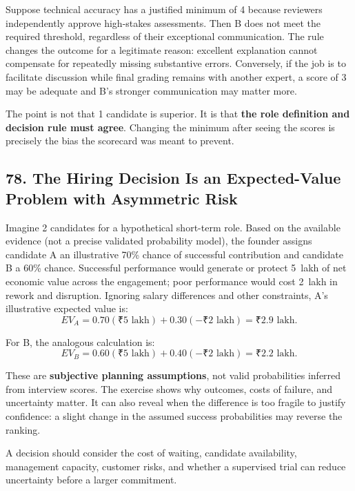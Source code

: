 Suppose technical accuracy has a justified minimum of 4 because reviewers independently approve high-stakes assessments. Then B does not meet the required threshold, regardless of their exceptional communication. The rule changes the outcome for a legitimate reason: excellent explanation cannot compensate for repeatedly missing substantive errors. Conversely, if the job is to facilitate discussion while final grading remains with another expert, a score of 3 may be adequate and B's stronger communication may matter more.

The point is not that 1 candidate is superior. It is that \textbf{the role definition and decision rule must agree}. Changing the minimum after seeing the scores is precisely the bias the scorecard was meant to prevent.

\subsection*{78. The Hiring Decision Is an Expected-Value Problem with Asymmetric Risk}

Imagine 2 candidates for a hypothetical short-term role. Based on the available evidence (not a precise validated probability model), the founder assigns candidate A an illustrative 70\% chance of successful contribution and candidate B a 60\% chance. Successful performance would generate or protect 5~lakh of net economic value across the engagement; poor performance would cost 2~lakh in rework and disruption. Ignoring salary differences and other constraints, A's illustrative expected value is:
\begin{equation}
EV_A = 0.70(\text{₹}5\text{ lakh}) + 0.30(-\text{₹}2\text{ lakh}) = \text{₹}2.9\text{ lakh}.
\end{equation}

For B, the analogous calculation is:
\begin{equation}
EV_B = 0.60(\text{₹}5\text{ lakh}) + 0.40(-\text{₹}2\text{ lakh}) = \text{₹}2.2\text{ lakh}.
\end{equation}

These are \textbf{subjective planning assumptions}, not valid probabilities inferred from interview scores. The exercise shows why outcomes, costs of failure, and uncertainty matter. It can also reveal when the difference is too fragile to justify confidence: a slight change in the assumed success probabilities may reverse the ranking.

A decision should consider the cost of waiting, candidate availability, management capacity, customer risks, and whether a supervised trial can reduce uncertainty before a larger commitment.

